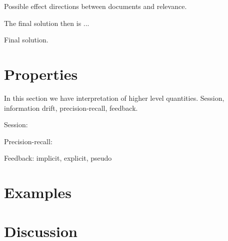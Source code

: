 \documentclass[10pt]{tufte-handout}
\begin{document}
\begin{marginfigure}%

\noindent{}
\caption{Possible effect directions between documents and
  relevance.}
\label{fig:graph4}
\end{marginfigure}

The final solution then is ...

\begin{marginfigure}%
\noindent{}
\caption{Final solution.}
\label{fig:graph5}
\end{marginfigure}


\section{Properties}

In this section we have interpretation of higher level quantities. Session, information drift, precision-recall, feedback.

Session:

Precision-recall:

Feedback: implicit, explicit, pseudo


\section{Examples}

\section{Discussion}
\end{document}

